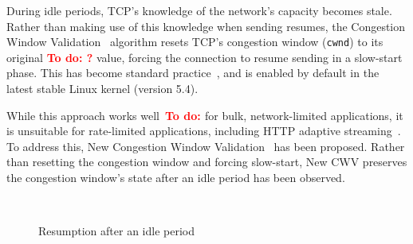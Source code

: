\documentclass[10pt,sigconf,anonymous]{acmart}
\newcommand{\todo}[1]{\textbf{\textcolor{red}{To do: #1}}}
\begin{document}

During idle periods, TCP's knowledge of the network's capacity becomes stale. Rather than making use of this knowledge when sending resumes, the Congestion Window Validation~\cite{rfc2861-2000-padhye-congestion-window-validation} algorithm resets TCP's congestion window (\texttt{cwnd}) to its original \todo{?} value, forcing the connection to resume sending in a slow-start phase. This has become standard practice~\cite{rfc5681-congeston-control}, and is enabled by default in the latest stable Linux kernel (version 5.4).

While this approach works well~\todo{\cite{..}} for bulk, network-limited applications, it is unsuitable for rate-limited applications, including HTTP adaptive streaming~\cite{Esteban-2012-Interactions-HTTP-TCP}. To address this, New Congestion Window Validation~\cite{rfc7661-2015-fairhurst-new-cwnd-validation} has been proposed. Rather than resetting the congestion window and forcing slow-start, New CWV preserves the congestion window's state after an idle period has been observed. 

\begin{figure}[t!]
  \centering
    \\
    \caption{Resumption after an idle period}
    \label{fig:transmission-after-idle}
\end{figure}
\end{document}

